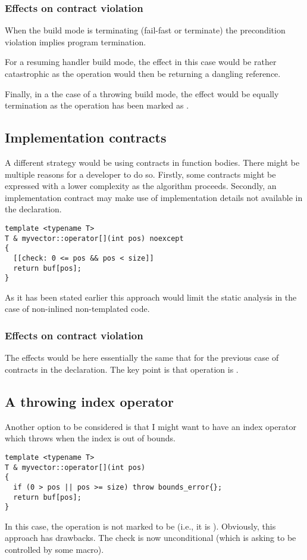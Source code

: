\subsubsection{Effects on contract violation}

When the build mode is terminating (fail-fast or terminate) the precondition
violation implies program termination. 

For a resuming handler build mode, the effect in this case would be rather catastrophic as
the operation would then be returning a dangling reference.

Finally, in a the case of a throwing build mode, the effect would be equally
termination as the operation has been marked as .

\subsection{Implementation contracts}

A different strategy would be using contracts in function bodies. There might be
multiple reasons for a developer to do so. Firstly, some contracts might be
expressed with a lower complexity as the algorithm proceeds. Secondly, an
implementation contract may make use of implementation details not available in
the declaration.

\begin{lstlisting}
template <typename T>
T & myvector::operator[](int pos) noexcept
{
  [[check: 0 <= pos && pos < size]] 
  return buf[pos];
}
\end{lstlisting}

As it has been stated earlier this approach would limit the static analysis in
the case of non-inlined non-templated code.

\subsubsection{Effects on contract violation}

The effects would be here essentially the same that for the previous case of
contracts in the declaration. The key point is that operation is .

\subsection{A throwing index operator}

Another option to be considered is that I might want to have an index operator
which throws when the index is out of bounds.

\begin{lstlisting}
template <typename T>
T & myvector::operator[](int pos)
{
  if (0 > pos || pos >= size) throw bounds_error{};
  return buf[pos];
}
\end{lstlisting}

In this case, the operation is not marked to be  (i.e., it is
). Obviously, this approach has drawbacks. The check is
now unconditional (which is asking to be controlled by some macro). 
